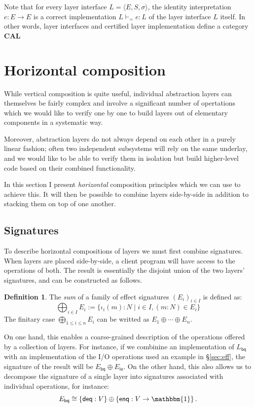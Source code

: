 \documentclass[11pt,oneside,draft]{book}
\theoremstyle{definition}
\newtheorem{definition}[theorem]{Definition}
\newcommand{\kw}[1]{\ensuremath{ \mathsf{#1} }}
\begin{document}
Note that for every layer interface
$L = \langle E, S, \sigma \rangle$,
the identity interpretation $e : E \rightarrow E$
is a correct implementation $L \vdash_{=} e : L$
of the layer interface $L$ itself.
In other words,
layer interfaces and certified layer implementation
define a category $\mathbf{CAL}$



\section{Horizontal composition} %

While vertical composition is quite useful,
individual abstraction layers can themselves be fairly complex
and involve a significant number of opertations
which we would like to verify one by one
to build layers out of elementary components
in a systematic way.

Moreover,
abstraction layers do not always depend on each other
in a purely linear fashion;
often two independent subsystems will rely on the same underlay,
and we would like to be able to verify them in isolation
but build higher-level code based on their combined functionality.

In this section I present \emph{horizontal} composition principles
which we can use to achieve this.
It will then be possible to combine layers
side-by-side in addition to stacking them
on top of one another.

\subsection{Signatures} \label{sec:hcomp:sig} %

To describe horizontal compositions of layers
we must first combine signatures.
When layers are placed side-by-side,
a client program will have access to
the operations of both.
The result is essentially
the disjoint union of the two layers' signatures,
and can be constructed as follows.

\begin{definition} \label{def:sigsum}
The \emph{sum} of a family of effect signatures $(E_i)_{i \in I}$
is defined as:
\[
  \bigoplus_{i \in I} E_i :=
    \{ \iota_i(m) \mathbin: N \mid i \in I, (m \mathbin: N) \in E_i \}
\]
The finitary case $\bigoplus_{1 \le i \le n} E_i$
can be writted as $E_1 \oplus \cdots \oplus E_n$.
\end{definition}

On one hand,
this enables a coarse-grained description
of the operations offered by a collection of layers.
For instance,
if we combinine an implementation of $L_\kw{bq}$
with an implementation of the I/O operations
used an example in \S\ref{sec:eff},
the signature of the result will be $E_\kw{bq} \oplus E_\kw{io}$.
On the other hand,
this also allows us to decompose the signature
of a single layer into signatures associated with
individual operations,
for instance:
\[
  E_\kw{bq} \cong
    \{ \kw{deq} : V \} \oplus \{ \kw{enq} : V \rightarrow \mathbbm{1} \}
  \,.
\]
\end{document}

